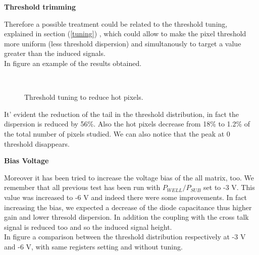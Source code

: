  
\begin{description}
\item \textbf{Threshold trimming}
\end{description}
 
Therefore a possible treatment could be related to the threshold tuning, explained in section (\vref{tuning}) , which could allow to make the pixel threshold more uniform (less threshold dispersion) and simultanously to target a value greater than the induced signals. \\

In figure  an example of the results obtained.

\begin{figure}
\centering
{}\quad
{}\\
\caption{Threshold tuning to reduce hot pixels.}
\label{fig:tuning_hot}
\end{figure} 

It' evident the reduction of the tail in the threshold distribution, in fact the dispersion is reduced by 56\%. Also the hot pixels decrease from 18\% to 1.2\% of the total number of pixels studied. We can also notice that the peak at 0 threshold disappears.


\begin{description}
\item \textbf{Bias Voltage}
\end{description}

Moreover it has been tried to increase the voltage bias of the all matrix, too. We remember that all previous test has been run with $P_{WELL}/P_{SUB}$ set to -3 V. This value was increased to -6 V and indeed there were some improvements. In fact increasing the bias, we expected a decrease of the diode capacitance thus higher gain and lower thresold dispersion. In addition the coupling with the cross talk signal is reduced too and so the induced signal height. \\
In figure  a comparison between the threshold distribution respectively at -3 V and -6 V, with same registers setting and without tuning.

